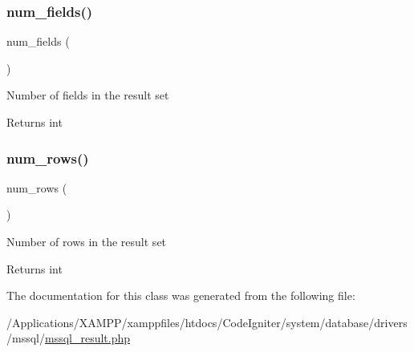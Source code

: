 \subsubsection{\texorpdfstring{num\+\_\+fields()}{num\_fields()}}
{\footnotesize\ttfamily num\+\_\+fields (\begin{DoxyParamCaption}{ }\end{DoxyParamCaption})}

Number of fields in the result set

\begin{DoxyReturn}{Returns}
int 
\end{DoxyReturn}
\mbox{\label{class_c_i___d_b__mssql__result_a218657c303ee499b97710ab0cd2f5d6e}} 
\subsubsection{\texorpdfstring{num\+\_\+rows()}{num\_rows()}}
{\footnotesize\ttfamily num\+\_\+rows (\begin{DoxyParamCaption}{ }\end{DoxyParamCaption})}

Number of rows in the result set

\begin{DoxyReturn}{Returns}
int 
\end{DoxyReturn}


The documentation for this class was generated from the following file\+:\begin{DoxyCompactItemize}
\item 
/\+Applications/\+X\+A\+M\+P\+P/xamppfiles/htdocs/\+Code\+Igniter/system/database/drivers/mssql/\mbox{\hyperlink{mssql__result_8php}{mssql\+\_\+result.\+php}}\end{DoxyCompactItemize}
